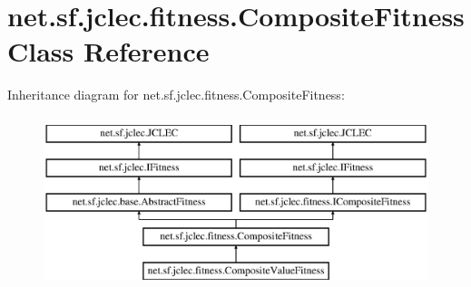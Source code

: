 \hypertarget{classnet_1_1sf_1_1jclec_1_1fitness_1_1_composite_fitness}{\section{net.\-sf.\-jclec.\-fitness.\-Composite\-Fitness Class Reference}
\label{classnet_1_1sf_1_1jclec_1_1fitness_1_1_composite_fitness}
}
Inheritance diagram for net.\-sf.\-jclec.\-fitness.\-Composite\-Fitness\-:\begin{figure}[H]
\begin{center}
\leavevmode
\includegraphics[height=5.000000cm]{classnet_1_1sf_1_1jclec_1_1fitness_1_1_composite_fitness}
\end{center}
\end{figure}
